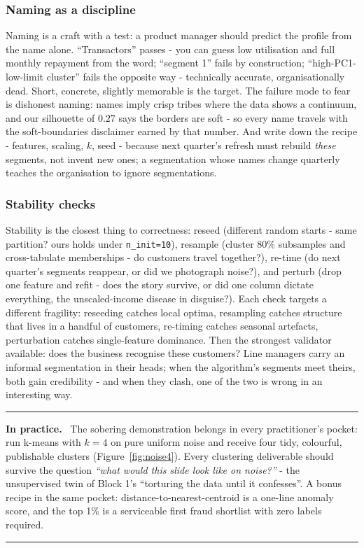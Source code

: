 \documentclass[11pt,a4paper]{article}
\newenvironment{practice}
  {\par\medskip\noindent\begin{minipage}{\linewidth}
   \rule{\linewidth}{0.4pt}\par\smallskip
   \small\textbf{In practice.}\ }
  {\par\smallskip\rule{\linewidth}{0.4pt}\end{minipage}\medskip\par}
\begin{document}
\subsubsection{Naming as a discipline}
Naming is a craft with a test: a product manager should predict the
profile from the name alone. ``Transactors'' passes - you can guess
low utilisation and full monthly repayment from the word; ``segment 1''
fails by construction; ``high-PC1-low-limit cluster'' fails the
opposite way - technically accurate, organisationally dead. Short,
concrete, slightly memorable is the target. The failure mode to fear is
dishonest naming: names imply crisp tribes where the data shows a
continuum, and our silhouette of $0.27$ says the borders are soft - so
every name travels with the soft-boundaries disclaimer earned by that
number. And write down the recipe - features, scaling, $k$, seed -
because next quarter's refresh must rebuild \emph{these} segments, not
invent new ones; a segmentation whose names change quarterly teaches
the organisation to ignore segmentations.

\subsubsection{Stability checks}
Stability is the closest thing to correctness: reseed (different random
starts - same partition? ours holds under \texttt{n\_init=10}),
resample (cluster 80\% subsamples and cross-tabulate memberships - do
customers travel together?), re-time (do next quarter's segments
reappear, or did we photograph noise?), and perturb (drop one feature
and refit - does the story survive, or did one column dictate
everything, the unscaled-income disease in disguise?). Each check
targets a different fragility: reseeding catches local optima,
resampling catches structure that lives in a handful of customers,
re-timing catches seasonal artefacts, perturbation catches
single-feature dominance. Then the strongest validator available: does
the business recognise these customers? Line managers carry an informal
segmentation in their heads; when the algorithm's segments meet theirs,
both gain credibility - and when they clash, one of the two is wrong
in an interesting way.

\begin{practice}
The sobering demonstration belongs in every practitioner's pocket: run
k-means with $k=4$ on pure uniform noise and receive four tidy,
colourful, publishable clusters (Figure~\ref{fig:noise4}). Every
clustering deliverable should survive the question \emph{``what would
this slide look like on noise?''} - the unsupervised twin of Block 1's
``torturing the data until it confesses''. A bonus recipe in the same
pocket: distance-to-nearest-centroid is a one-line anomaly score, and the
top 1\% is a serviceable first fraud shortlist with zero labels required.
\end{practice}
\end{document}
